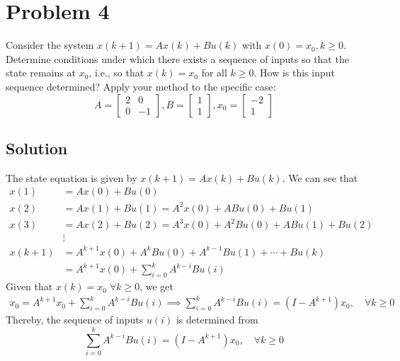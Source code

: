 \section*{Problem 4}

Consider the system \( x(k+1)=A x(k)+B u(k) \) with \( x(0)=x_{0}, k \geq 0 \).
Determine conditions under which there exists a sequence of inputs so that the state remains at \( x_{0} \), i.e., so that \( x(k)=x_{0} \) for all \( k \geq 0 \).
How is this input sequence determined?
Apply your method to the specific case:
\[
    A=\left[\begin{array}{cc}
            2 & 0  \\
            0 & -1
        \end{array}\right], B=\left[\begin{array}{l}
            1 \\
            1
        \end{array}\right], x_{0}=\left[\begin{array}{c}
            -2 \\
            1
        \end{array}\right]
\]

\subsection*{Solution}

The state equation is given by \( x(k+1)=A x(k)+B u(k) \).
We can see that
\begin{align*}
    x(1)
     & =
    A x(0)+B u(0)
    \\
    x(2)
     & =
    A x(1)+B u(1)
    =
    A^{2} x(0)+A B u(0)+B u(1)
    \\
    x(3)
     & =
    A x(2)+B u(2)
    =
    A^{3} x(0)+A^{2} B u(0)+A B u(1)+B u(2)
    \\
     & \vdots
    \\
    x(k + 1)
     & =
    A^{k + 1} x(0)+A^{k} B u(0)+A^{k - 1} B u(1)+\cdots+B u(k)
    \\ & =
    A^{k + 1} x(0)+\sum_{i=0}^{k} A^{k - i} B u(i)
\end{align*}
Given that \( x(k)=x_{0} \; \forall k \geq 0 \), we get
\begin{align*}
    x_0
    =
    A^{k + 1} x_0 + \sum_{i=0}^{k} A^{k - i} B u(i)
    \implies
    \sum_{i=0}^{k} A^{k - i} B u(i) = (I - A^{k + 1}) x_0, \quad \forall k \geq 0
\end{align*}
Thereby, the sequence of inputs \( u(i) \) is determined from
\begin{equation*}
    \boxed{
        \sum_{i=0}^{k} A^{k - i} B u(i) = (I - A^{k + 1}) x_0, \quad \forall k \geq 0
    }
\end{equation*}

